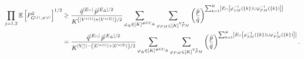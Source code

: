 \documentclass[final]{colt2026}
\newcommand{\1}{\mathbf{1}}
\newcommand{\bbE}{\mathbb{E}}
\newcommand{\pa}[1]{\left(#1\right)}
\newcommand{\ac}[1]{\left\{#1\right\}}
\newcommand{\cro}[1]{\left[#1\right]}
\begin{document}
\begin{align}
\prod_{j=1,2}\bbE\cro{P_{G^{(j)}, \pi^{(j)}}^2}^{1/2} & \geq {\bar q^{|E_{\cap}|}\,\bar p^{|E_{\Delta}|/2}\over K^{\pa{|V^{\star(1)}|+|V^{\star(2)}|}/2}} \sum_{\varphi_{\Delta}\in [K]^{\#\mathrm{CC}_{\Delta}}} \sum_{\varphi_{PM}\in [K]^{V^{\star}_{PM}}}  \pa{\bar p\over \bar q}^{\sum_{k=1}^K\left|E_{\cap}\cro{\varphi_{SM}^{-1}(\ac{k})\cup\varphi_{PM}^{-1}(\ac{k})}\right|} \nonumber\\
\label{eq:restrictedLB1}
&=  {\bar q^{|E_{\cap}|}\,\bar p^{|E_{\Delta}|/2}\over K^{|V^{\star}_{\cup}|-\pa{|U^{\star(1)}|+|U^{\star(2)}|}/2}} \sum_{\varphi_{\Delta}\in [K]^{\#\mathrm{CC}_{\Delta}}} \sum_{\varphi_{PM}\in [K]^{V^{\star}_{PM}}}  \pa{\bar p\over \bar q}^{\sum_{k=1}^K\left|E_{\cap}\cro{\varphi_{SM}^{-1}(\ac{k})\cup\varphi_{PM}^{-1}(\ac{k})}\right|}.
\end{align}
\end{document}
